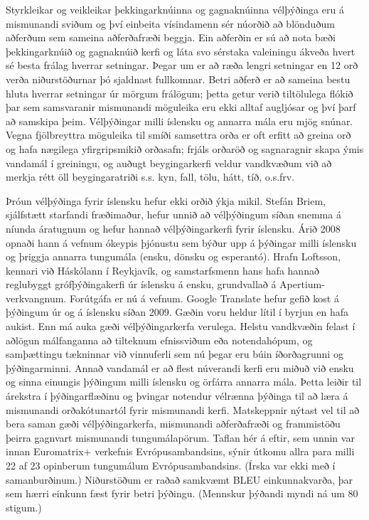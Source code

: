 \documentclass{../../metanetpaper}
\begin{document}
\begin{multicols}{2}
Styrkleikar og veikleikar þekkingarknúinna og gagnaknúinna vélþýðinga eru á mismunandi sviðum og því einbeita vísindamenn sér núorðið að blönduðum aðferðum sem sameina aðferðafræði beggja. Ein aðferðin er sú að nota bæði þekkingarknúið og gagnaknúið kerfi og láta svo sérstaka valeiningu ákveða hvert sé besta frálag hverrar setningar. Þegar um er að ræða lengri setningar en 12 orð verða niðurstöðurnar þó sjaldnast fullkomnar. Betri aðferð er að sameina bestu hluta hverrar setningar úr mörgum frálögum; þetta getur verið tiltölulega flókið þar sem samsvaranir mismunandi möguleika eru ekki alltaf augljósar og því þarf að samskipa þeim. Vélþýðingar milli íslensku og annarra mála eru mjög snúnar. Vegna fjölbreyttra möguleika til smíði samsettra orða er oft erfitt að greina orð og hafa nægilega yfirgripsmikið orðasafn; frjáls orðaröð og sagnaragnir skapa ýmis vandamál í greiningu, og auðugt beygingarkerfi veldur vandkvæðum við að merkja rétt öll beygingaratriði s.s. kyn, fall, tölu, hátt, tíð, o.s.frv.

Þróun vélþýðinga fyrir íslensku hefur ekki orðið ýkja mikil. Stefán Briem, sjálfstætt starfandi fræðimaður, hefur unnið að vélþýðingum síðan snemma á níunda áratugnum og hefur hannað vélþýðingarkerfi fyrir íslensku. Árið 2008 opnaði hann á vefnum ókeypis þjónustu sem býður upp á þýðingar milli íslensku og þriggja annarra tungumála (ensku, dönsku og esperantó)\cite{tut1}. Hrafn Loftsson, kennari við Háskólann í Reykjavík, og samstarfsmenn hans hafa hannað reglubyggt grófþýðingakerfi úr íslensku á ensku, grundvallað á Apertium-verkvangnum\cite{ape1}. Forútgáfa er nú á vefnum\cite{ape2}. Google Translate hefur gefið kost á þýðingum úr og á íslensku síðan 2009. Gæðin voru heldur lítil í byrjun en hafa aukist.
Enn má auka gæði vélþýðingarkerfa verulega. Helstu vandkvæðin felast í aðlögun málfanganna að tilteknum efnissviðum eða notendahópum, og samþættingu tækninnar við vinnuferli sem nú þegar eru búin íðorðagrunni og þýðingarminni. Annað vandamál er að flest núverandi kerfi eru miðuð við ensku og sinna einungis þýðingum milli íslensku og örfárra annarra mála. Þetta leiðir til árekstra í þýðingarflæðinu og þvingar notendur vélrænna þýðinga til að læra á mismunandi orðakótunartól fyrir mismunandi kerfi.
Matskeppnir nýtast vel til að bera saman gæði vélþýðingarkerfa, mismunandi aðferðafræði og frammistöðu þeirra gagnvart mismunandi tungumálapörum. Taflan hér á eftir, sem unnin var innan Euromatrix+ verkefnis Evrópusambandsins, sýnir útkomu allra para milli 22 af 23 opinberum tungumálum Evrópusambandsins. (Írska var ekki með í samanburðinum.) Niðurstöðum er raðað samkvæmt BLEU einkunnakvarða, þar sem hærri einkunn fæst fyrir betri þýðingu\cite{bleu1}.  (Mennskur þýðandi myndi ná um 80 stigum.)


\end{multicols}
\end{document}
